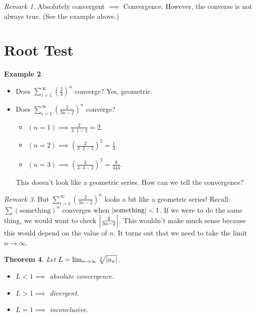 \documentclass[12pt, psamsfonts]{amsart}
\newtheorem{thm}{Theorem}[section]
\theoremstyle{definition}
\newtheorem{exmp}[thm]{Example}
\theoremstyle{remark}
\newtheorem{rem}[thm]{Remark}
\numberwithin{equation}{section}
\begin{document}
\begin{rem}
  Absolutely convergent $\implies$ Convergence.
  However, the converse is not always true.
  (See the example above.)
\end{rem}

\section{Root Test}

\begin{exmp}
$ $
  \begin{itemize}
    \item
      Does $\sum_{i=1}^{\infty} (\frac{2}{3})^n$ converge?
      Yes, geometric.
    \item
      Does $\sum_{i=1}^{\infty} (\frac{2}{3n - 2})^n$ converge?
      \begin{itemize}
        \item
          $(n = 1) \implies \frac{2}{3 \cdot 1 - 2} = 2$.
        \item
          $(n = 2) \implies (\frac{2}{3 \cdot 2 - 2})^2= \frac{1}{4}$.
        \item
          $(n = 3) \implies (\frac{2}{3 \cdot 3 - 2})^3 = \frac{8}{343}$.
      \end{itemize}
      This doesn't look like a geometric series.
      How can we tell the convergence?
  \end{itemize}
\end{exmp}

\begin{rem}
  But $\sum_{i=1}^{\infty} (\frac{2}{3n - 2})^n$ looks a bit like a geometric series!
  Recall: $\sum (\text{something})^n$ converges when $\abs{\text{something}} < 1$.
  If we were to do the same thing, we would want to check $\abs{\frac{2}{3n - 2}}$.
  This wouldn't make much sense because this would depend on the value of $n$.
  It turns out that we need to take the limit $n \rightarrow \infty$.
\end{rem}

\begin{thm}
  Let $L = \lim_{n \rightarrow \infty} \sqrt[n]{\abs{a_n}}$.
  \begin{itemize}
    \item
      $L < 1 \implies$ absolute convergence.
    \item
      $L > 1 \implies$ divergent.
    \item
      $L = 1 \implies$ inconclusive.
  \end{itemize}
\end{thm}
\end{document}
